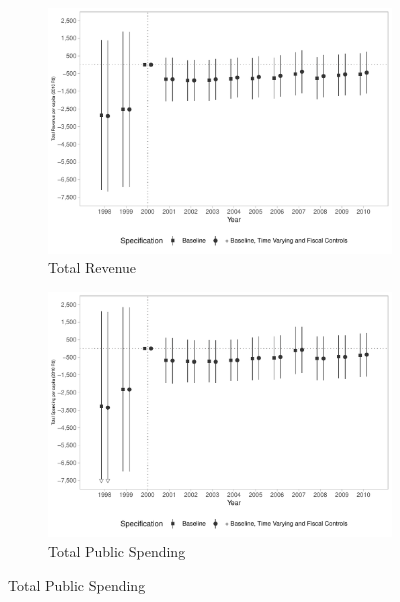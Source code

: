 \begin{figure}[h!]
    \begin{center}
    \caption{Fiscal Reactions}\label{fig:6}
    \begin{subfigure}{0.49\textwidth}
        \caption{\scriptsize Total Revenue}\label{fig:6a}
        \centering
        \includegraphics[width=\textwidth]{plots/finbra_reccorr_pcapita_dist_ec29_baseline_dist_ec29_baseline_6.pdf}
    \end{subfigure}
    \begin{subfigure}{0.49\textwidth}
        \centering
        \caption{\scriptsize Total Public Spending}\label{fig:6b}
        \includegraphics[width=\textwidth]{plots/finbra_desp_o_pcapita_dist_ec29_baseline_dist_ec29_baseline_6.pdf}
    \end{subfigure}
    
    \end{center}
    
\end{figure}
